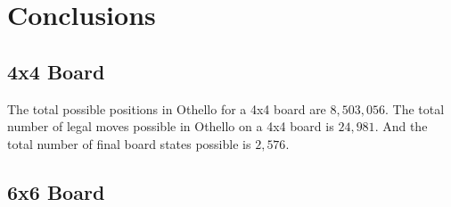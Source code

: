 \documentclass{article}
\begin{document}
\newpage

\section{Conclusions}

\subsection{4x4 Board}

The total possible positions in Othello for a 4x4 board are $8,503,056$.\cite{wiki} The total number of legal moves possible in Othello on a 4x4 board is $24,981$. And the total number of final board states possible is $2,576$.

\subsection{6x6 Board}



\newpage
\printbibliography[title={Bibliography}]
\end{document}
